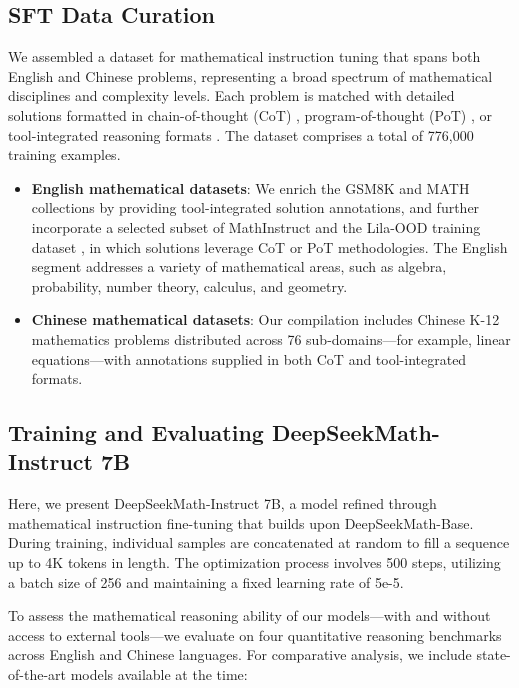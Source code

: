 \subsection{SFT Data Curation}

We assembled a dataset for mathematical instruction tuning that spans both English and Chinese problems, representing a broad spectrum of mathematical disciplines and complexity levels. Each problem is matched with detailed solutions formatted in chain-of-thought (CoT) \citep{cot}, program-of-thought (PoT) \citep{pot,pal}, or tool-integrated reasoning formats \citep{tora}. The dataset comprises a total of 776,000 training examples.

\begin{itemize}[topsep=0pt]
    \item \textbf{English mathematical datasets}: We enrich the GSM8K and MATH collections by providing tool-integrated solution annotations, and further incorporate a selected subset of MathInstruct \citep{MathInstruct} and the Lila-OOD training dataset \citep{lila}, in which solutions leverage CoT or PoT methodologies. The English segment addresses a variety of mathematical areas, such as algebra, probability, number theory, calculus, and geometry.
    \item \textbf{Chinese mathematical datasets}: Our compilation includes Chinese K-12 mathematics problems distributed across 76 sub-domains—for example, linear equations—with annotations supplied in both CoT and tool-integrated formats.
\end{itemize}

\subsection{Training and Evaluating DeepSeekMath-Instruct 7B}

Here, we present DeepSeekMath-Instruct 7B, a model refined through mathematical instruction fine-tuning that builds upon DeepSeekMath-Base. During training, individual samples are concatenated at random to fill a sequence up to 4K tokens in length. The optimization process involves 500 steps, utilizing a batch size of 256 and maintaining a fixed learning rate of 5e-5.

To assess the mathematical reasoning ability of our models—with and without access to external tools—we evaluate on four quantitative reasoning benchmarks across English and Chinese languages. For comparative analysis, we include state-of-the-art models available at the time:

